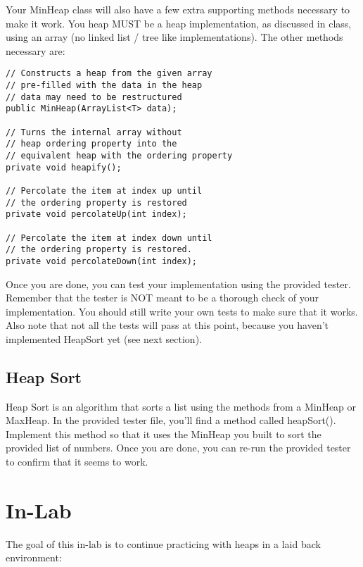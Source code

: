 \documentclass[paper=a4, fontsize=11pt, parskip=full]{scrartcl} %
\numberwithin{equation}{section} %
\numberwithin{figure}{section} %
\numberwithin{table}{section} %
\begin{document}
Your MinHeap class will also have a few extra supporting methods necessary to make it work. You heap MUST be a heap implementation, as discussed in class, using an array (no linked list / tree like implementations). The other methods necessary are: 

\begin{lstlisting}
// Constructs a heap from the given array
// pre-filled with the data in the heap
// data may need to be restructured
public MinHeap(ArrayList<T> data);

// Turns the internal array without
// heap ordering property into the
// equivalent heap with the ordering property
private void heapify();

// Percolate the item at index up until
// the ordering property is restored
private void percolateUp(int index);

// Percolate the item at index down until
// the ordering property is restored.
private void percolateDown(int index);
\end{lstlisting}

Once you are done, you can test your implementation using the provided tester. Remember that the tester is NOT meant to be a thorough check of your implementation. You should still write your own tests to make sure that it works. Also note that not all the tests will pass at this point, because you haven't implemented HeapSort yet (see next section).

\subsection{Heap Sort}

Heap Sort is an algorithm that sorts a list using the methods from a MinHeap or MaxHeap. In the provided tester file, you'll find a method called heapSort(). Implement this method so that it uses the MinHeap you built to sort the provided list of numbers. Once you are done, you can re-run the provided tester to confirm that it seems to work.


\newpage
\section{In-Lab}

The goal of this in-lab is to continue practicing with heaps in a laid back environment:
\end{document}
